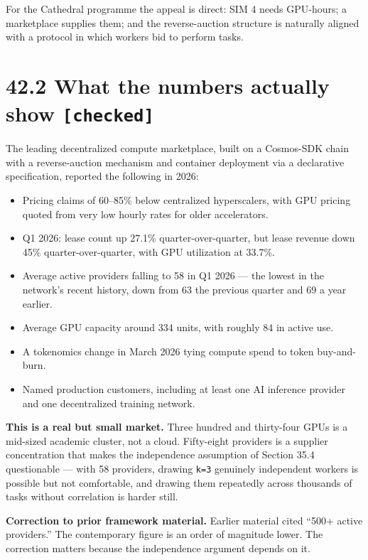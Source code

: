 \documentclass[
  11pt]{report}
\providecommand{\tightlist}{%
  \setlength{\itemsep}{0pt}\setlength{\parskip}{0pt}}
\begin{document}
For the Cathedral programme the appeal is direct: SIM 4 needs GPU-hours;
a marketplace supplies them; and the reverse-auction structure is
naturally aligned with a protocol in which workers bid to perform tasks.

\hypertarget{what-the-numbers-actually-show-checked}{%
\section{\texorpdfstring{42.2 What the numbers actually show
\texttt{{[}checked{]}}}{42.2 What the numbers actually show {[}checked{]}}}\label{what-the-numbers-actually-show-checked}}

The leading decentralized compute marketplace, built on a Cosmos-SDK
chain with a reverse-auction mechanism and container deployment via a
declarative specification, reported the following in 2026:

\begin{itemize}
\tightlist
\item
  Pricing claims of 60--85\% below centralized hyperscalers, with GPU
  pricing quoted from very low hourly rates for older accelerators.
\item
  Q1 2026: lease count up 27.1\% quarter-over-quarter, but lease revenue
  down 45\% quarter-over-quarter, with GPU utilization at 33.7\%.
\item
  Average active providers falling to 58 in Q1 2026 --- the lowest in
  the network's recent history, down from 63 the previous quarter and 69
  a year earlier.
\item
  Average GPU capacity around 334 units, with roughly 84 in active use.
\item
  A tokenomics change in March 2026 tying compute spend to token
  buy-and-burn.
\item
  Named production customers, including at least one AI inference
  provider and one decentralized training network.
\end{itemize}

\textbf{This is a real but small market.} Three hundred and thirty-four
GPUs is a mid-sized academic cluster, not a cloud. Fifty-eight providers
is a supplier concentration that makes the independence assumption of
Section 35.4 questionable --- with 58 providers, drawing \texttt{k=3}
genuinely independent workers is possible but not comfortable, and
drawing them repeatedly across thousands of tasks without correlation is
harder still.

\textbf{Correction to prior framework material.} Earlier material cited
``500+ active providers.'' The contemporary figure is an order of
magnitude lower. The correction matters because the independence
argument depends on it.
\end{document}
